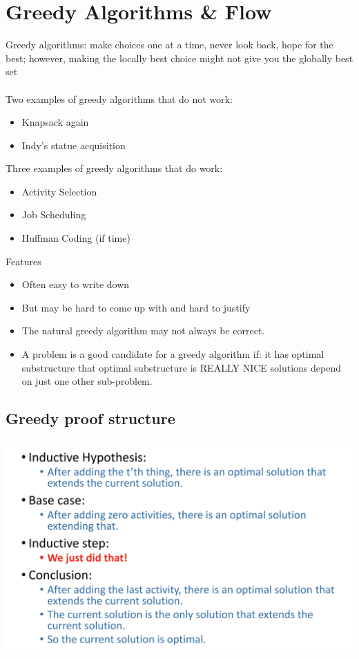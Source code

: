 \documentclass[12pt]{article}
\begin{document}
\newpage
\section{Greedy Algorithms \& Flow}
Greedy algorithms: make choices one at a time, never look back, hope for the best; however, making the locally best choice might not give you the globally best set
\\\\
Two examples of greedy algorithms that do not
work:
\begin{itemize}
    \item Knapsack again
    \item Indy's statue acquisition
\end{itemize}
Three examples of greedy algorithms that do work:
\begin{itemize}
    \item Activity Selection
    \item Job Scheduling
    \item Huffman Coding (if time)
\end{itemize}
Features
\begin{itemize}
\item Often easy to write down
\item But may be hard to come up with and hard to justify
\item The natural greedy algorithm may not always be
correct.
\item A problem is a good candidate for a greedy
algorithm if:
\subsubitem it has optimal substructure
\subsubitem that optimal substructure is REALLY NICE
\subsubitem solutions depend on just one other sub-problem.
\end{itemize}
\subsection*{Greedy proof structure}
\includegraphics[scale=0.3]{greedyproof.png} 
\end{document}
